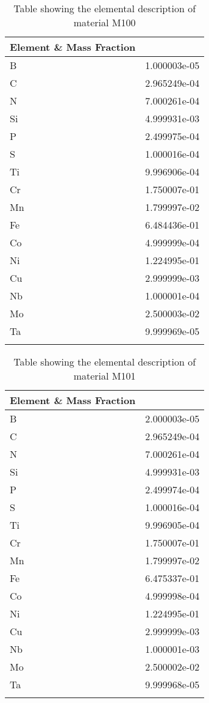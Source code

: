 \begin{centering}
\begin{longtable}[ht!]
{ p{} | p{} }
\hline
Element \& Mass Fraction\\
\hline
B &  1.000003e-05\\
C &  2.965249e-04\\
N &  7.000261e-04\\
Si &  4.999931e-03\\
P &  2.499975e-04\\
S &  1.000016e-04\\
Ti &  9.996906e-04\\
Cr &  1.750007e-01\\
Mn &  1.799997e-02\\
Fe &  6.484436e-01\\
Co &  4.999999e-04\\
Ni &  1.224995e-01\\
Cu &  2.999999e-03\\
Nb &  1.000001e-04\\
Mo &  2.500003e-02\\
Ta &  9.999969e-05\\
\caption{Table showing the elemental description of material M100}
\label{table:material_M100}
\end{longtable}
\clearpage
\begin{longtable}[ht!]
{ p{} | p{} }
\hline
Element \& Mass Fraction\\
\hline
B &  2.000003e-05\\
C &  2.965249e-04\\
N &  7.000261e-04\\
Si &  4.999931e-03\\
P &  2.499974e-04\\
S &  1.000016e-04\\
Ti &  9.996905e-04\\
Cr &  1.750007e-01\\
Mn &  1.799997e-02\\
Fe &  6.475337e-01\\
Co &  4.999998e-04\\
Ni &  1.224995e-01\\
Cu &  2.999999e-03\\
Nb &  1.000001e-03\\
Mo &  2.500002e-02\\
Ta &  9.999968e-05\\
\caption{Table showing the elemental description of material M101}
\label{table:material_M101}
\end{longtable}

\end{centering}
